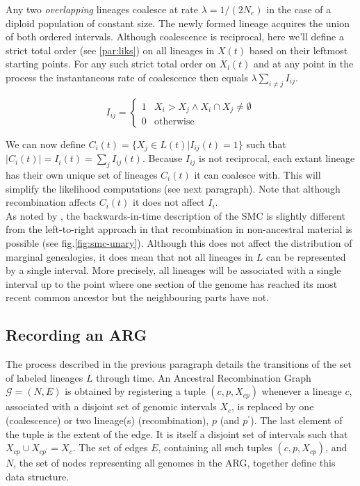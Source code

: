 \documentclass{article}
\begin{document}
Any two \emph{overlapping} lineages coalesce at rate $\lambda = 1/(2N_e)$ in the case
of a diploid population of constant size. The newly formed lineage acquires the 
union of both ordered intervals.
Although coalescence is reciprocal, here we'll define a strict total order 
(see \ref{par:liks}) on 
all lineages in $X(t)$ based on their leftmost starting points. 
For any such strict total order on $X_l(t)$ and at any point in the process 
the instantaneous rate of coalescence then equals $\lambda \sum_{i \neq j} I_{ij}$.

\begin{equation} \label{def:coal}
I_{ij} = \begin{cases}
1 & X_i > X_j \wedge X_i \cap X_j \neq \emptyset \\
0 & \text{otherwise}
\end{cases}
\end{equation}

We can now define $C_i(t) = \{X_j \in L(t) | I_{ij}(t) = 1\}$ such that $|C_i(t)| = 
I_{i}(t) = \sum_{j} I_{ij}(t)$.
Because $I_{ij}$ is not reciprocal, each extant lineage has their own unique set of 
lineages $C_i(t)$ it can coalesce with. This will simplify the likelihood computations 
(see next paragraph). Note that although recombination affects $C_i(t)$ it does not 
affect $I_{i}$.\\ 

As noted by \cite{mcvean_approximating_2005}, the backwards-in-time description of the 
SMC is slightly different from the left-to-right approach in that recombination 
in non-ancestral material is possible (see fig.\ref{fig:smc-unary}). 
Although this does not affect the distribution 
of marginal genealogies, it does mean that not all lineages in $L$ can be represented 
by a single interval. More precisely, all lineages will be associated with 
a single interval up to the point where one section of the 
genome has reached its most recent common ancestor but the neighbouring parts have not.

\subsection{Recording an ARG} \label{par:recording}

The process described in the previous paragraph details the transitions of the 
set of labeled lineages $L$ through time. An Ancestral Recombination Graph 
$\mathcal{G} = (N, E)$ is obtained by registering a tuple $(c, p, X_{cp})$ whenever a 
lineage $c$, associated with a disjoint set of genomic intervals $X_c$, is 
replaced by one (coalescence) or two lineage(s) (recombination), $p$ (and $p^{\prime}$).
The last element of the tuple is the extent of the edge. It is itself a  
disjoint set of intervals such that $X_{cp} \cup X_{cp^{\prime}} = X_c$. 
The set of edges $E$, containing all such tuples $(c, p, X_{cp})$, 
and $N$, the set of nodes representing all genomes in the ARG, together
define this data structure.\\
\end{document}
